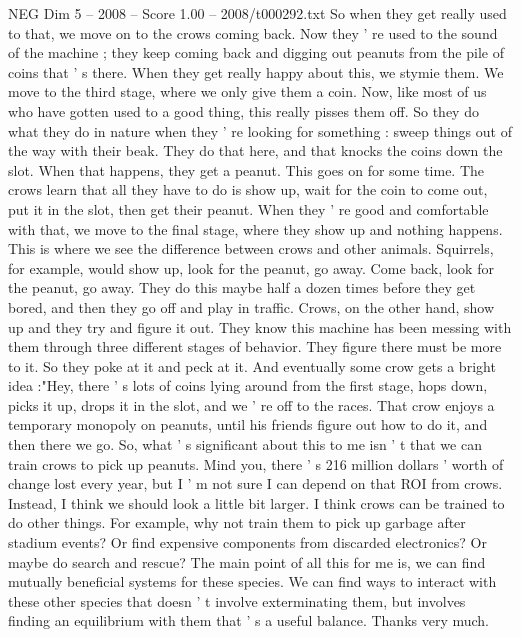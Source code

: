 \begin{textsample}{NEG Dim 5 – 2008 – Score 1.00 – 2008/t000292.txt}
So when they get really used to that, we move on to the crows coming back.
Now they ' re used to the sound of the machine ; they keep coming back and digging out peanuts from the pile of coins that ' s there.
When they get really happy about this, we stymie them.
We move to the third stage, where we only give them a coin.
Now, like most of us who have gotten used to a good thing, this really pisses them off.
So they do what they do in nature when they ' re looking for something : sweep things out of the way with their beak.
They do that here, and that knocks the coins down the slot.
When that happens, they get a peanut.
This goes on for some time.
The crows learn that all they have to do is show up, wait for the coin to come out, put it in the slot, then get their peanut.
When they ' re good and comfortable with that, we move to the final stage, where they show up and nothing happens.
This is where we see the difference between crows and other animals.
Squirrels, for example, would show up, look for the peanut, go away.
Come back, look for the peanut, go away.
They do this maybe half a dozen times before they get bored, and then they go off and play in traffic.
Crows, on the other hand, show up and they try and figure it out.
They know this machine has been messing with them through three different stages of behavior.
They figure there must be more to it.
So they poke at it and peck at it.
And eventually some crow gets a bright idea :"Hey, there ' s lots of coins lying around from the first stage, hops down, picks it up, drops it in the slot, and we ' re off to the races.
That crow enjoys a temporary monopoly on peanuts, until his friends figure out how to do it, and then there we go.
So, what ' s significant about this to me isn ' t that we can train crows to pick up peanuts.
Mind you, there ' s 216 million dollars ' worth of change lost every year, but I ' m not sure I can depend on that ROI from crows.
Instead, I think we should look a little bit larger.
I think crows can be trained to do other things.
For example, why not train them to pick up garbage after stadium events?
Or find expensive components from discarded electronics?
Or maybe do search and rescue?
The main point of all this for me is, we can find mutually beneficial systems for these species.
We can find ways to interact with these other species that doesn ' t involve exterminating them, but involves finding an equilibrium with them that ' s a useful balance.
Thanks very much.

\end{textsample}
